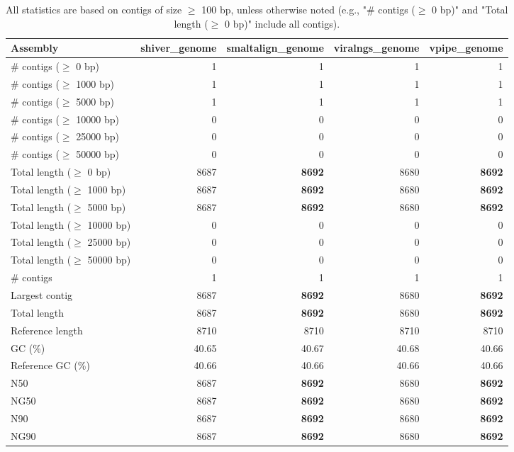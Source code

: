 \documentclass[12pt,a4paper]{article}
\begin{document}
\begin{table}[ht]
\begin{center}
\caption{All statistics are based on contigs of size $\geq$ 100 bp, unless otherwise noted (e.g., "\# contigs ($\geq$ 0 bp)" and "Total length ($\geq$ 0 bp)" include all contigs).}
\begin{tabular}{|l*{4}{|r}|}
\hline
Assembly & shiver\_genome & smaltalign\_genome & viralngs\_genome & vpipe\_genome \\ \hline
\# contigs ($\geq$ 0 bp) & 1 & 1 & 1 & 1 \\ \hline
\# contigs ($\geq$ 1000 bp) & 1 & 1 & 1 & 1 \\ \hline
\# contigs ($\geq$ 5000 bp) & 1 & 1 & 1 & 1 \\ \hline
\# contigs ($\geq$ 10000 bp) & 0 & 0 & 0 & 0 \\ \hline
\# contigs ($\geq$ 25000 bp) & 0 & 0 & 0 & 0 \\ \hline
\# contigs ($\geq$ 50000 bp) & 0 & 0 & 0 & 0 \\ \hline
Total length ($\geq$ 0 bp) & 8687 & {\bf 8692} & 8680 & {\bf 8692} \\ \hline
Total length ($\geq$ 1000 bp) & 8687 & {\bf 8692} & 8680 & {\bf 8692} \\ \hline
Total length ($\geq$ 5000 bp) & 8687 & {\bf 8692} & 8680 & {\bf 8692} \\ \hline
Total length ($\geq$ 10000 bp) & 0 & 0 & 0 & 0 \\ \hline
Total length ($\geq$ 25000 bp) & 0 & 0 & 0 & 0 \\ \hline
Total length ($\geq$ 50000 bp) & 0 & 0 & 0 & 0 \\ \hline
\# contigs & 1 & 1 & 1 & 1 \\ \hline
Largest contig & 8687 & {\bf 8692} & 8680 & {\bf 8692} \\ \hline
Total length & 8687 & {\bf 8692} & 8680 & {\bf 8692} \\ \hline
Reference length & 8710 & 8710 & 8710 & 8710 \\ \hline
GC (\%) & 40.65 & 40.67 & 40.68 & 40.66 \\ \hline
Reference GC (\%) & 40.66 & 40.66 & 40.66 & 40.66 \\ \hline
N50 & 8687 & {\bf 8692} & 8680 & {\bf 8692} \\ \hline
NG50 & 8687 & {\bf 8692} & 8680 & {\bf 8692} \\ \hline
N90 & 8687 & {\bf 8692} & 8680 & {\bf 8692} \\ \hline
NG90 & 8687 & {\bf 8692} & 8680 & {\bf 8692} \\ \hline

\end{tabular}
\end{center}
\end{table}
\end{document}
